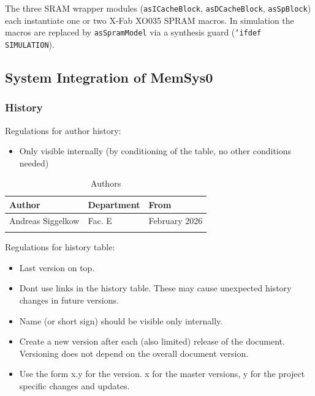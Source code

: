 The three SRAM wrapper modules (\texttt{asICacheBlock}, \texttt{asDCacheBlock},
\texttt{asSpBlock}) each instantiate one or two X-Fab XO035 SPRAM macros.
In simulation the macros are replaced by \texttt{asSpramModel} via a
synthesis guard (\texttt{`ifdef SIMULATION}).

\subsection{System Integration of MemSys0}
\subsubsection{History}
Regulations for author history:
\begin{itemize}
  \item Only visible internally (by conditioning of the table, no other conditions needed)
\end{itemize}

\begin{table}[H]
\caption{Authors}
\label{tab:memsysauth01a}
\centering
\begin{tabularx}{\textwidth}{|X |X |X |}
  \hline
  Author & Department & From \\
  \hline
  \hline
  Andreas Siggelkow & Fac. E & February 2026 \\
  \hline
  && \\
  \hline
\end{tabularx}
\end{table}

Regulations for history table:
\begin{itemize}
  \item Last version on top.
  \item Dont use links in the history table. These may cause unexpected history changes in future versions.
  \item Name (or short sign) should be visible only internally.
  \item Create a new version after each (also limited) release of the document. Versioning does not depend on the overall document version.
  \item Use the form x.y for the version. x for the master versions, y for the project specific changes and updates.
\end{itemize}

